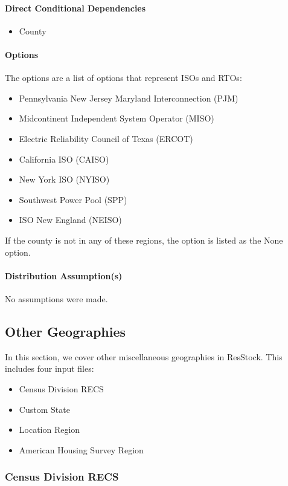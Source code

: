 \paragraph{Direct Conditional Dependencies}
\begin{itemize}
    \item County
\end{itemize}

\paragraph{Options}
The options are a list of options that represent ISOs and RTOs:
\begin{itemize}
    \item Pennsylvania New Jersey Maryland Interconnection (PJM)
    \item Midcontinent Independent System Operator (MISO)
    \item Electric Reliability Council of Texas (ERCOT)
    \item California ISO (CAISO)
    \item New York ISO (NYISO)
    \item Southwest Power Pool (SPP)
    \item ISO New England (NEISO)
\end{itemize}
If the county is not in any of these regions, the option is listed as the None option.

\paragraph{Distribution Assumption(s)}
No assumptions were made.

\subsection{Other Geographies}

In this section, we cover other miscellaneous geographies in ResStock. This includes four input files:
\begin{itemize}
    \item Census Division RECS
    \item Custom State
    \item Location Region
    \item American Housing Survey Region
\end{itemize}

\subsubsection{Census Division RECS}
